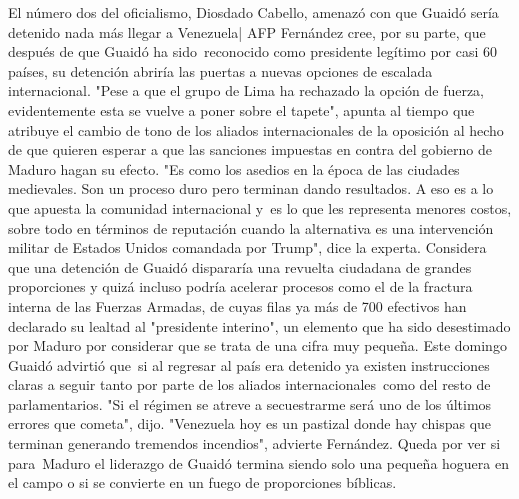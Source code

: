 \documentclass{article}%
\begin{document}
\newline%
%
El número dos del oficialismo, Diosdado Cabello, amenazó con que Guaidó sería detenido nada más llegar a Venezuela| AFP%
\newline%
%
Fernández cree, por su parte, que después de que Guaidó ha sido~reconocido como presidente legítimo por casi 60 países, su detención abriría las puertas a nuevas opciones de escalada internacional.%
\newline%
%
"Pese a que el grupo de Lima ha rechazado la opción de fuerza, evidentemente esta se vuelve a poner sobre el tapete", apunta al tiempo que atribuye el cambio de tono de los aliados internacionales de la oposición al hecho de que quieren esperar a que las sanciones impuestas en contra del gobierno de Maduro hagan su efecto.%
\newline%
%
"Es como los asedios en la época de las ciudades medievales. Son un proceso duro pero terminan dando resultados. A eso es a lo que apuesta la comunidad internacional y~es lo que les representa menores costos, sobre todo en términos de reputación cuando la alternativa es una intervención militar de Estados Unidos comandada por Trump", dice la experta.%
\newline%
%
Considera que una detención de Guaidó dispararía una revuelta ciudadana de grandes proporciones y quizá incluso podría acelerar procesos como el de la fractura interna de las Fuerzas Armadas, de cuyas filas ya más de 700 efectivos han declarado su lealtad al "presidente interino", un elemento que ha sido desestimado por Maduro por considerar que se trata de una cifra muy pequeña.%
\newline%
%
Este domingo Guaidó advirtió que~si al regresar al país era detenido ya existen instrucciones claras a seguir tanto por parte de los aliados internacionales~como del resto de parlamentarios.%
\newline%
%
"Si el régimen se atreve a secuestrarme será uno de los últimos errores que cometa", dijo.%
\newline%
%
"Venezuela hoy es un pastizal donde hay chispas que terminan generando tremendos incendios", advierte Fernández.%
\newline%
%
Queda por ver si para~Maduro el liderazgo de Guaidó termina siendo solo una pequeña hoguera en el campo o si se convierte en un fuego de proporciones bíblicas.%
\newline%
%
\end{document}
